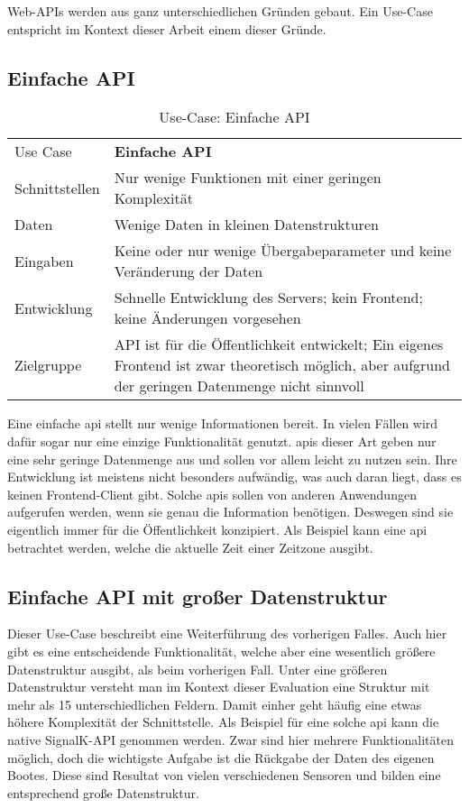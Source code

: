 Web-APIs werden aus ganz unterschiedlichen Gründen gebaut. Ein Use-Case entspricht  im Kontext dieser Arbeit einem dieser Gründe. 

\subsection{Einfache API}

\begin{table}[H]
\begin{tabular}{p{3cm} p{11cm}}
Use Case & \textbf{Einfache API} \\
Schnittstellen & Nur wenige Funktionen mit einer geringen Komplexität \\
Daten & Wenige Daten in kleinen Datenstrukturen \\
Eingaben & Keine oder nur wenige Übergabeparameter und keine Veränderung der Daten \\
Entwicklung & Schnelle Entwicklung des Servers; kein Frontend; keine Änderungen vorgesehen \\
Zielgruppe & API ist für die Öffentlichkeit entwickelt; Ein eigenes Frontend ist zwar theoretisch möglich, aber aufgrund der geringen Datenmenge nicht sinnvoll
\end{tabular}
\caption{Use-Case: Einfache API}
\end{table}

Eine einfache \ac{api} stellt nur wenige Informationen bereit. In vielen Fällen wird dafür sogar nur eine einzige Funktionalität genutzt. \ac{api}s dieser Art geben nur eine sehr geringe Datenmenge aus und sollen vor allem leicht zu nutzen sein. Ihre Entwicklung ist meistens nicht besonders aufwändig, was auch daran liegt, dass es keinen Frontend-Client gibt. Solche \ac{api}s sollen von anderen Anwendungen aufgerufen werden, wenn sie genau die Information benötigen. Deswegen sind sie eigentlich immer für die Öffentlichkeit konzipiert. Als Beispiel kann eine \ac{api} betrachtet werden, welche die aktuelle Zeit einer Zeitzone ausgibt.

\subsection{Einfache API mit großer Datenstruktur}

Dieser Use-Case beschreibt eine Weiterführung des vorherigen Falles. Auch hier gibt es eine entscheidende Funktionalität, welche aber eine wesentlich größere Datenstruktur ausgibt, als beim vorherigen Fall. Unter eine größeren Datenstruktur versteht man im Kontext dieser Evaluation eine Struktur mit mehr als 15 unterschiedlichen Feldern. Damit einher geht häufig eine etwas höhere Komplexität der Schnittstelle. Als Beispiel für eine solche \ac{api} kann die native SignalK-API genommen werden. Zwar sind hier mehrere Funktionalitäten möglich, doch die wichtigste Aufgabe ist die Rückgabe der Daten des eigenen Bootes. Diese sind Resultat von vielen verschiedenen Sensoren und bilden eine entsprechend große Datenstruktur.

